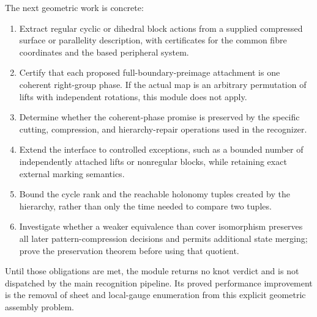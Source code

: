 The next geometric work is concrete:
\begin{enumerate}
\item Extract regular cyclic or dihedral block actions from a supplied
compressed surface or parallelity description, with certificates for
the common fibre coordinates and the based peripheral system.
\item Certify that each proposed full-boundary-preimage attachment is
one coherent right-group phase.  If the actual map is an arbitrary
permutation of lifts with independent rotations, this module does not
apply.
\item Determine whether the coherent-phase promise is preserved by the
specific cutting, compression, and hierarchy-repair operations used in
the recognizer.
\item Extend the interface to controlled exceptions, such as a bounded
number of independently attached lifts or nonregular blocks, while
retaining exact external marking semantics.
\item Bound the cycle rank and the reachable holonomy tuples created
by the hierarchy, rather than only the time needed to compare two
tuples.
\item Investigate whether a weaker equivalence than cover isomorphism
preserves all later pattern-compression decisions and permits additional
state merging; prove the preservation theorem before using that quotient.
\end{enumerate}

Until those obligations are met, the module returns no knot verdict and
is not dispatched by the main recognition pipeline.  Its proved
performance improvement is the removal of sheet and local-gauge
enumeration from this explicit geometric assembly problem.
